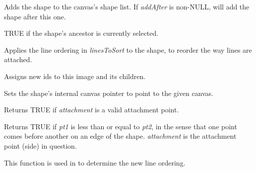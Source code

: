 Adds the shape to the canvas's shape list. If {\it addAfter} is
non-NULL, will add the shape after this one.



TRUE if the shape's ancestor is currently selected.

\label{wxshapeapplyattachmentordering}


Applies the line ordering in {\it linesToSort} to the shape, to reorder the way lines are attached.



Assigns new ids to this image and its children.

\label{wxshapeattach}


Sets the shape's internal canvas pointer to point to the given canvas.

\label{wxshapeattachmentisvalid}


Returns TRUE if {\it attachment} is a valid attachment point.

\label{wxshapeattachmentsorttest}


Returns TRUE if {\it pt1} is less than or equal to {\it pt2}, in the sense
that one point comes before another on an edge of the shape. {\it attachment} is
the attachment point (side) in question.

This function is used in  to
determine the new line ordering.

\label{wxshapecalcsimpleattachment}


